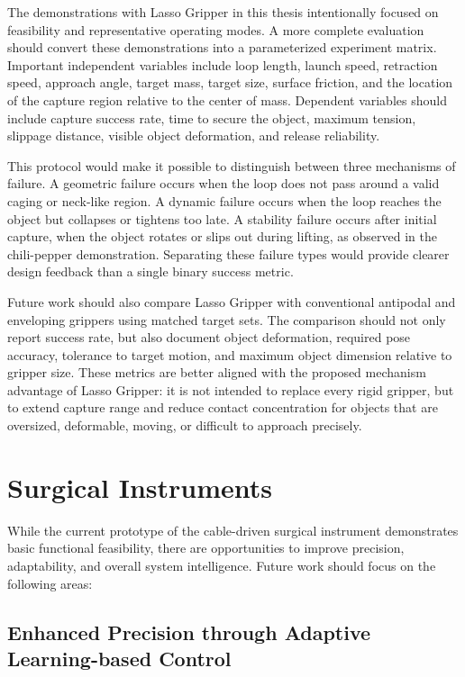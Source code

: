 The demonstrations with Lasso Gripper in this thesis intentionally focused on feasibility and representative operating modes. A more complete evaluation should convert these demonstrations into a parameterized experiment matrix. Important independent variables include loop length, launch speed, retraction speed, approach angle, target mass, target size, surface friction, and the location of the capture region relative to the center of mass. Dependent variables should include capture success rate, time to secure the object, maximum tension, slippage distance, visible object deformation, and release reliability.

This protocol would make it possible to distinguish between three mechanisms of failure. A geometric failure occurs when the loop does not pass around a valid caging or neck-like region. A dynamic failure occurs when the loop reaches the object but collapses or tightens too late. A stability failure occurs after initial capture, when the object rotates or slips out during lifting, as observed in the chili-pepper demonstration. Separating these failure types would provide clearer design feedback than a single binary success metric.

Future work should also compare Lasso Gripper with conventional antipodal and enveloping grippers using matched target sets. The comparison should not only report success rate, but also document object deformation, required pose accuracy, tolerance to target motion, and maximum object dimension relative to gripper size. These metrics are better aligned with the proposed mechanism advantage of Lasso Gripper: it is not intended to replace every rigid gripper, but to extend capture range and reduce contact concentration for objects that are oversized, deformable, moving, or difficult to approach precisely.

\section{Surgical Instruments}
While the current prototype of the cable-driven surgical instrument demonstrates basic functional feasibility, there are opportunities to improve precision, adaptability, and overall system intelligence. Future work should focus on the following areas:

\subsection{Enhanced Precision through Adaptive Learning-based Control}

